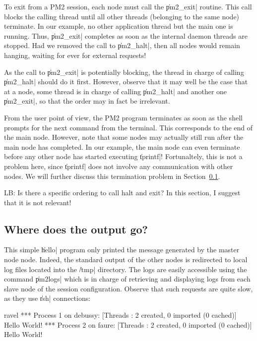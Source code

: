 To exit from a PM2 session, each node must call the \|pm2_exit|
routine.  This call blocks the calling thread until all other threads
(belonging to the same node) terminate. In our example, no other
application thread but the main one is running. Thus, \|pm2_exit|
completes as soon as the internal daemon threads are stopped. Had we
removed the call to \|pm2_halt|, then all nodes would remain hanging,
waiting for ever for external requests!

As the call to \|pm2_exit| is potentially blocking, the thread in
charge of calling \|pm2_halt| should do it first. However, observe
that it may well be the case that at a node, some thread is in charge
of calling \|pm2_halt| and another one \|pm2_exit|, so that the order
may in fact be irrelevant.

From the user point of view, the PM2 program terminates as soon as the
shell prompts for the next command from the terminal. This corresponds
to the end of the main node. However, note that some nodes may
actually still run after the main node has completed.  In our example,
the main node can even terminate before any other node has started
executing \|tprintf|! Fortunaltely, this is not a problem here, since
\|tprintf| does not involve any communication with other nodes. We will
further discuss this termination problem in Section~\ref{sec:output}.

\begin{note}
  LB: Is there a specific ordering to call halt and exit? In this
  section, I suggest that it is not relevant!
\end{note}


\subsection{Where does the output go?}
\label{sec:output}

This simple \|hello| program only printed the message generated by the
master node node. Indeed, the standard output of the other nodes is
redirected to local log files located into the \|/tmp| directory.  The
logs are easily accessible using the command \|pm2logs| which is in
charge of retrieving and displaying logs from each slave node of the
session configuration. Observe that such requests are quite slow, as
they use \|rsh| connections:
\begin{shell}
ravel%
*** Process 1 on debussy:
[Threads : 2 created, 0 imported (0 cached)]
Hello World!
*** Process 2 on faure:
[Threads : 2 created, 0 imported (0 cached)]
Hello World!
\end{shell}

